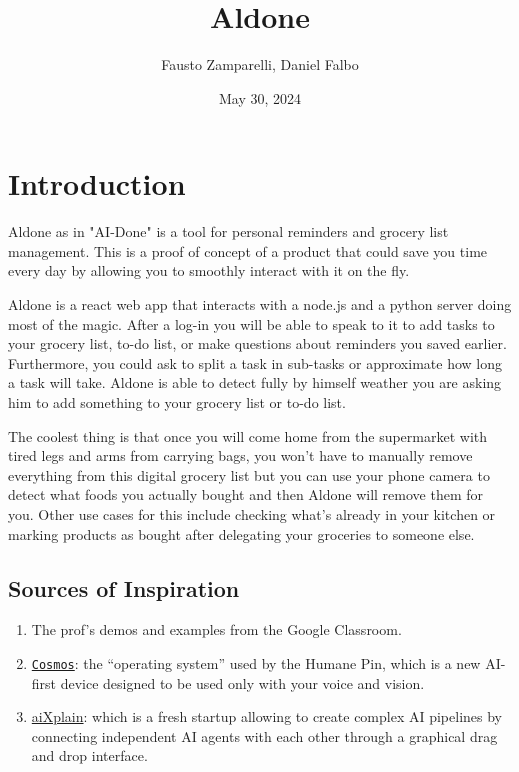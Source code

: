 \documentclass{article}
\title{\textbf{Aldone}}
\author{Fausto Zamparelli, Daniel Falbo}
\date{May 30, 2024}
\begin{document}
\maketitle

\section*{\color{draculagreen}Introduction}
Aldone as in "AI-Done" is a tool for personal reminders and grocery list management.
This is a proof of concept of a product that could save you time every day by allowing you
to smoothly interact with it on the fly.

Aldone is a react web app that interacts with a node.js and a python server doing most of the magic.
After a log-in you will be able to speak to it to add tasks to your grocery list, to-do list,
or make questions about reminders you saved earlier.
Furthermore, you could ask to split a task in sub-tasks or approximate how long a task will take.
Aldone is able to detect fully by himself weather you are asking him to add something to your grocery list or to-do list.

The coolest thing is that once you will come home from the supermarket with tired legs and arms from carrying bags, you won't have to manually remove everything from this digital grocery list but you can use your phone camera to detect what foods you actually bought and then Aldone will remove them for you. Other use cases for this include checking what's already in your kitchen or marking products as bought after delegating your groceries to someone else.

\subsection*{Sources of Inspiration}

\begin{enumerate}
  \item The prof's demos and examples from the Google Classroom.
  \item \href{https://humane.com/media/cosmos-an-operating-system-for-the-ai-era}{\texttt{Cosmos}}: the ``operating system'' used by the Humane Pin, which is a new AI-first device designed to be used only with your voice and vision.
  \item \href{https://aixplain.com/}{aiXplain}: which is a fresh startup allowing to create complex AI pipelines by connecting independent AI agents with each other through a graphical drag and drop interface.
\end{enumerate}
\end{document}
